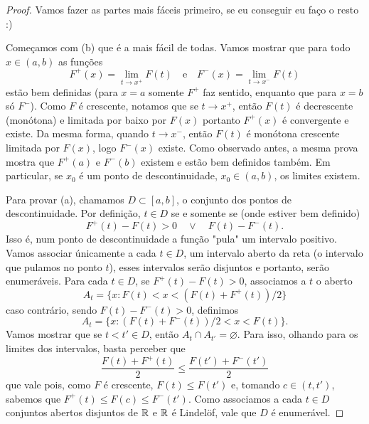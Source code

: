 \begin{proof}
    Vamos fazer as partes mais fáceis primeiro, se eu conseguir eu faço o resto :)

    Começamos com (b) que é a mais fácil de todas. Vamos mostrar que para todo $x \in (a,b)$
    as funções 
    $$F^+(x) = \lim_{t\to x^+} F(t) \quad \text{e}\quad F^-(x) = \lim_{t\to x^-} F(t)$$
    estão bem definidas (para $x = a$ somente $F^+$ faz sentido, enquanto que para $x=b$ só $F^-$). Como $F$ é crescente,
    notamos que se $t\to x^+$, então $F(t)$ é decrescente (monótona) e limitada por baixo por $F(x)$
    portanto $F^+(x)$ é convergente e existe. Da mesma forma, quando $t \to x^-$, então $F(t)$ é monótona crescente limitada por $F(x)$,
    logo $F^-(x)$ existe. Como observado antes, a mesma prova mostra que $F^+(a)$ e $F^-(b)$ existem e estão bem definidos também. 
    Em particular, se $x_0$ é um ponto de descontinuidade, $x_0 \in (a,b)$, os limites existem.

    Para provar (a), chamamos $D \subset [a,b]$, o conjunto dos pontos de descontinuidade. Por definição, $t \in D$ se e somente se (onde estiver 
    bem definido)
    $$F^+(t) - F(t) > 0 \quad \lor \quad F(t) - F^-(t).$$
    Isso é, num ponto de descontinuidade a função "pula" um intervalo positivo. Vamos associar únicamente a cada $t \in D$, um intervalo aberto da reta 
    (o intervalo que pulamos no ponto $t$), esses intervalos serão disjuntos e portanto, serão enumeráveis.
    Para cada $t \in D$, se $F^+(t) - F(t) > 0$, associamos a $t$ o aberto
    $$A_t = \{x : F(t) < x < (F(t) + F^+(t))/2\}$$
    caso contrário, sendo $F(t) - F^-(t) > 0$, definimos 
    $$A_t = \{x : (F(t) + F^-(t))/2 < x < F(t)\}.$$
    Vamos mostrar que se $t < t' \in D$, então $A_t \cap A_{t'} = \varnothing$. Para isso, olhando para os limites dos intervalos, 
    basta perceber que 
    $$\frac{F(t) + F^+(t)}{2} \leq \frac{F(t') + F^-(t')}{2}$$
    que vale pois, como $F$ é crescente, $F(t) \leq F(t')$ e, tomando $c \in (t,t')$, sabemos que $F^+(t) \leq F(c) \leq F^-(t')$.
    Como associamos a cada $t \in D$ conjuntos abertos disjuntos de $\mathbb{R}$ e $\mathbb{R}$ é Lindelöf, vale que $D$ é enumerável. 
\end{proof}

